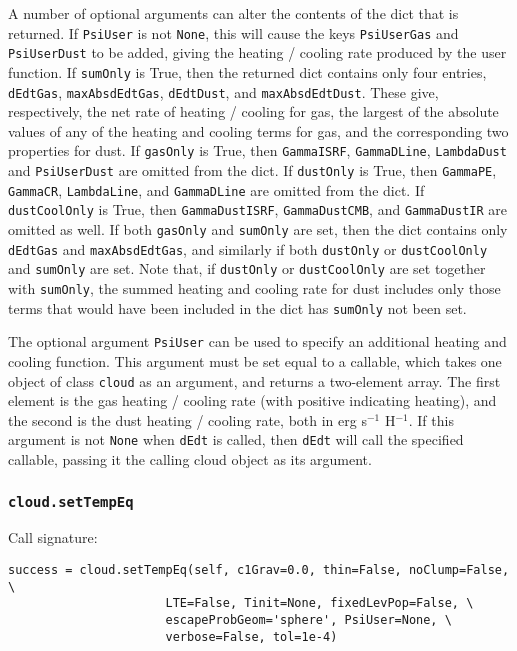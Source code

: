 \documentclass[12pt]{article}
\begin{document}
A number of optional arguments can alter the contents of the dict that is returned. If \verb=PsiUser= is not \verb=None=, this will cause the keys \verb=PsiUserGas= and \verb=PsiUserDust= to be added, giving the heating / cooling rate produced by the user function. If \verb=sumOnly= is True, then the returned dict contains only four entries, \verb=dEdtGas=, \verb=maxAbsdEdtGas=, \verb=dEdtDust=, and \verb=maxAbsdEdtDust=. These give, respectively, the net rate of heating / cooling for gas, the largest of the absolute values of any of the heating and cooling terms for gas, and the corresponding two properties for dust. If \verb=gasOnly= is True, then \verb=GammaISRF=, \verb=GammaDLine=, \verb=LambdaDust= and \verb=PsiUserDust= are omitted from the dict. If \verb=dustOnly= is True, then \verb=GammaPE=, \verb=GammaCR=, \verb=LambdaLine=, and \verb=GammaDLine= are omitted from the dict. If \verb=dustCoolOnly= is True, then \verb=GammaDustISRF=, \verb=GammaDustCMB=, and \verb=GammaDustIR= are omitted as well. If both \verb=gasOnly= and \verb=sumOnly= are set, then the dict contains only \verb=dEdtGas= and \verb=maxAbsdEdtGas=, and similarly if both \verb=dustOnly= or \verb=dustCoolOnly= and \verb=sumOnly= are set. Note that, if \verb=dustOnly= or \verb=dustCoolOnly= are set together with \verb=sumOnly=, the summed heating and cooling rate for dust includes only those terms that would have been included in the dict has \verb=sumOnly= not been set.

The optional argument \verb=PsiUser= can be used to specify an additional heating and cooling function. This argument must be set equal to a callable, which takes one object of class \verb=cloud= as an argument, and returns a two-element array. The first element is the gas heating / cooling rate (with positive indicating heating), and the second is the dust heating / cooling rate, both in erg s$^{-1}$ H$^{-1}$. If this argument is not \verb=None= when \verb=dEdt= is called, then \verb=dEdt= will call the specified callable, passing it the calling cloud object as its argument.

\subsubsection{\texttt{cloud.setTempEq}}
\label{sec:settempeq}

Call signature:

\begin{verbatim}
success = cloud.setTempEq(self, c1Grav=0.0, thin=False, noClump=False, \
                      LTE=False, Tinit=None, fixedLevPop=False, \
                      escapeProbGeom='sphere', PsiUser=None, \
                      verbose=False, tol=1e-4)
\end{verbatim}
\end{document}
